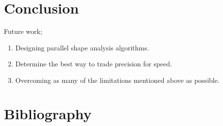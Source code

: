\documentclass{article}
\begin{document}
\section{Conclusion}

Future work;
\begin{enumerate}[1.]
    \item Designing parallel shape analysis algorithms.
    \item Determine the best way to trade precision for speed.
    \item Overcoming as many of the limitations mentioned above as possible.
\end{enumerate}

\section{Bibliography}
\end{document}
